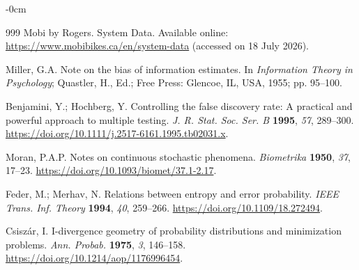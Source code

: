 \documentclass[applsci,article,submit,moreauthors]{Definitions/mdpi}
\begin{document}
\begin{adjustwidth}{-\extralength}{0cm}
\begin{thebibliography}{999}
Mobi by Rogers. System Data. Available online:
\url{https://www.mobibikes.ca/en/system-data}
(accessed on 18 July 2026).

Miller, G.A. Note on the bias of information estimates. In \emph{Information Theory in Psychology}; Quastler, H., Ed.; Free Press: Glencoe, IL, USA, 1955; pp. 95--100.

Benjamini, Y.; Hochberg, Y. Controlling the false discovery rate: A
practical and powerful approach to multiple testing. \emph{J. R. Stat. Soc.
Ser. B} \textbf{1995}, \emph{57}, 289--300.
\url{https://doi.org/10.1111/j.2517-6161.1995.tb02031.x}.

Moran, P.A.P. Notes on continuous stochastic phenomena.
\emph{Biometrika} \textbf{1950}, \emph{37}, 17--23.
\url{https://doi.org/10.1093/biomet/37.1-2.17}.

Feder, M.; Merhav, N. Relations between entropy and error probability.
\emph{IEEE Trans. Inf. Theory} \textbf{1994}, \emph{40}, 259--266.
\url{https://doi.org/10.1109/18.272494}.

Csisz\'ar, I. I-divergence geometry of probability distributions and
minimization problems. \emph{Ann. Probab.} \textbf{1975}, \emph{3},
146--158. \url{https://doi.org/10.1214/aop/1176996454}.

\end{thebibliography}

\PublishersNote{}
\end{adjustwidth}
\end{document}
